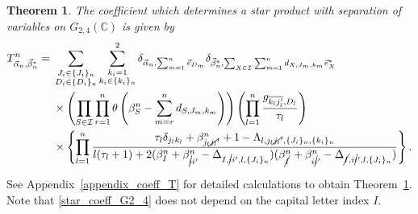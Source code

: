\documentclass[pdftex]{sigma}
\numberwithin{equation}{section}
\newtheorem{Theorem}{Theorem}[section]
\begin{document}
\begin{Theorem}\label{thm_star_coeff_G2_4}
The coefficient  which determines a star product with separation of variables on $G_{2,4}(\mathbb{C})$ is given by
\begin{align}
 T^{n}_{\vec{\alpha}_{n},\vec{\beta}_{n}^{\ast}}
 ={}&
 \sum_{
 \substack{
 J_{i}
 \in
 \{
 J_{i}
 \}_{n}
 \\
 D_{i}
 \in
 \{
 D_{i}
 \}_{n}
 }
 }
 \sum_{
 \substack{
 k_{i}=1
 \\
 k_{i}
 \in
 \{
 k_{i}
 \}_{n}
 }
 }^{2}
 \delta_{
 \vec{\alpha}_{n},
 \sum_{m=1}^{n}
 \vec{e}_{D_{m}}
 }
 \delta_{
 \vec{\beta}_{n}^{\ast},
 \sum_{
 X
 \in
 \mathcal{I}
 }
 \sum_{m=1}^{n}
 d_{
 X,
 J_{m},
 k_{m}
 }
 \vec{e}_{X}^{\ast}
 }
 \nonumber
 \\
 &
 \times
 \left(
 \prod_{
 S
 \in
 \mathcal{I}
 }
 \prod_{r=1}^{n}
 \theta
 \left(
 \beta_{S}^{n}
 -
 \sum_{m=r}^{n}
 d_{S,J_{m},k_{m}}
 \right)
 \right)
 \left(
 \prod_{l=1}^{n}
 \frac{g_{\overline{k_{l}j_{l}'},D_{l}}}{\tau_{l}}
 \right)
 \nonumber
 \\
 &
 \times
 \left\{
 \prod_{l=1}^{n}
 \frac{
 \tau_{l}
 \delta_{j_{l}k_{l}}
 +
 \beta_{j_{l}\cancel{j_{l}}'}^{n}
 +
 1
 -
 \Lambda_{
 l,
 j_{l}\cancel{j_{l}}',
 \{
 J_{i}
 \}_{n},
 \{
 k_{i}
 \}_{n}
 }
 }{
 l
 (
 \tau_{l}+1
 )
 +
 2
 (
 \beta_{I}^{n}
 +
 \beta_{\cancel{i}i'}^{n}
 -
 \Delta_{
 I,
 \cancel{i}i',
 l,
 \{
 J_{i}
 \}_{n}
 }
 )
 (
 \beta_{\cancel{I}}^{n}
 +
 \beta_{i\cancel{i}'}^{n}
 -
 \Delta_{
 \cancel{I},
 i\cancel{i}',
 l,
 \{
 J_{i}
 \}_{n}
 }
 )
 }
 \right\}
 .
 \label{star_coeff_G2_4}
\end{align}
\end{Theorem}

See Appendix~\ref{appendix_coeff_T} for detailed calculations to obtain Theorem~\ref{thm_star_coeff_G2_4}. Note that \eqref{star_coeff_G2_4} does not depend on the capital letter index $I$.
\end{document}
